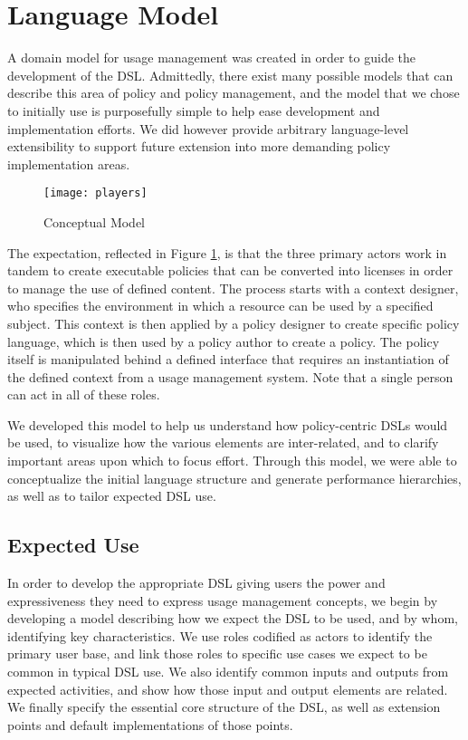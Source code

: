 \section{Language Model}\label{sec:model}
A domain model for usage management was created in order to guide the development of the DSL.  Admittedly, there exist many possible models that can describe this area of policy and policy management, and the model that we chose to initially use is purposefully simple to help ease development and implementation efforts.  We did however provide arbitrary language-level extensibility to support future extension into more demanding policy implementation areas.

\begin{figure}[!t]
\centering
\texttt{[image: players]}
\caption{Conceptual Model}
\label{fig:model:conceptual-model}
\end{figure}

The expectation, reflected in Figure \ref{fig:model:conceptual-model}, is that the three primary actors work in tandem to create executable policies that can be converted into licenses in order to manage the use of defined content.  The process starts with a context designer, who specifies the environment in which a resource can be used by a specified subject.  This context is then applied by a policy designer to create specific policy language, which is then used by a policy author to create a policy.  The policy itself is manipulated behind a defined interface that requires an instantiation of the defined context from a usage management system.  Note that a single person can act in all of these roles.

We developed this model to help us understand how policy-centric DSLs would be used, to visualize how the various elements are inter-related, and to clarify important areas upon which to focus effort.  Through this model, we were able to conceptualize the initial language structure and generate performance hierarchies, as well as to tailor expected DSL use.

\subsection{Expected Use}
In order to develop the appropriate DSL giving users the power and expressiveness they need to express usage management concepts, we begin by developing a model describing how we expect the DSL to be used, and by whom, identifying key characteristics.  We use roles codified as actors to identify the primary user base, and link those roles to specific use cases we expect to be common in typical DSL use.  We also identify common inputs and outputs from expected activities, and show how those input and output elements are related.  We finally specify the essential core structure of the DSL, as well as extension points and default implementations of those points.


